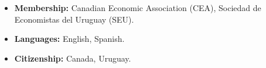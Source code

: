 \documentclass[overlapped,letterpaper,11pt]{res}
\newcommand{\cvrule}{%
  \hspace*{-\sectionwidth}%
  \rule[2mm]{\dimexpr\textwidth+\sectionwidth\relax}{.25pt}}
\newcommand{\cvsection}[1]{%
  \needspace{4\baselineskip}%
  \section{\textbf{#1}}%
  \cvrule}
\begin{document}
\begin{resume}
\begin{itemize}
\item \textbf{Membership:} Canadian Economic Association (CEA),
Sociedad de Economistas del Uruguay (SEU).

\item \textbf{Languages:} English, Spanish. 
\item \textbf{Citizenship:} Canada, Uruguay.

\end{itemize}


%
%

%
%
%
%


\end{resume}
\end{document}
